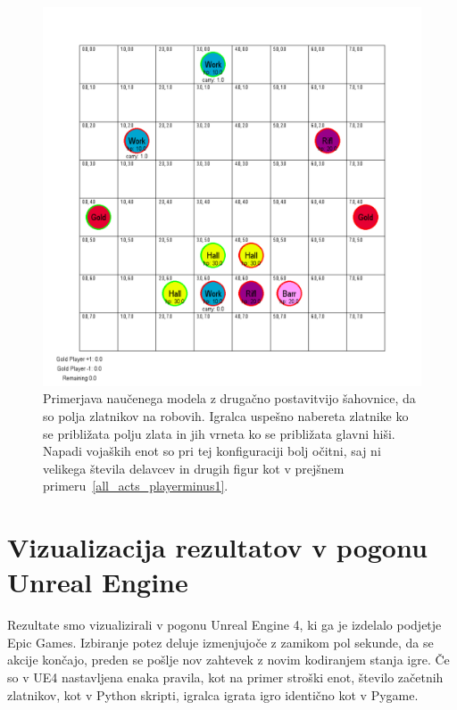 \documentclass[a4paper, 12pt]{book}
\begin{document}
\begin{figure}[h]
	\begin{center}
		\includegraphics[width=1\textwidth]{photos/pit_minerals_apart_100.pdf}
	\end{center}
	\caption{Primerjava naučenega modela z drugačno postavitvijo šahovnice, da so polja zlatnikov na robovih.
		Igralca uspešno nabereta zlatnike ko se približata polju zlata in jih vrneta ko se približata glavni hiši.
		Napadi vojaških enot so pri tej konfiguraciji bolj očitni, saj ni velikega števila delavcev in drugih figur kot v prejšnem primeru~\ref{all_acts_playerminus1}.}
	\label{pit_minerals_apart_100}
\end{figure}



\section{Vizualizacija rezultatov v pogonu Unreal Engine}
Rezultate smo vizualizirali v pogonu Unreal Engine 4, ki ga je izdelalo podjetje Epic Games.
Izbiranje potez deluje izmenjujoče z zamikom pol sekunde, da se akcije končajo, preden se pošlje nov zahtevek z novim kodiranjem stanja igre.
Če so v UE4 nastavljena enaka pravila, kot na primer stroški enot, število začetnih zlatnikov, kot v Python skripti, igralca igrata igro identično kot v Pygame.
\end{document}
